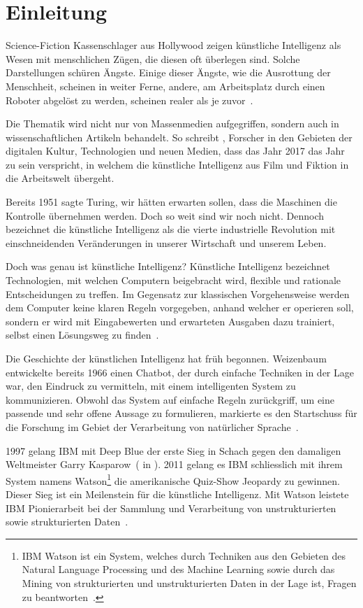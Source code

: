 \section{Einleitung}

Science-Fiction Kassenschlager aus Hollywood zeigen künstliche Intelligenz als Wesen mit menschlichen Zügen, die diesen oft überlegen sind. Solche Darstellungen schüren Ängste. Einige dieser Ängste, wie die Ausrottung der Menschheit, scheinen in weiter Ferne, andere, am Arbeitsplatz durch einen Roboter abgelöst zu werden, scheinen realer als je zuvor~\autocite{Lu2018}.

Die Thematik wird nicht nur von Massenmedien aufgegriffen, sondern auch in wissenschaftlichen Artikeln behandelt. So schreibt \textcite{Tredinnick2017}, Forscher in den Gebieten der digitalen Kultur, Technologien und neuen Medien, dass das Jahr 2017 das Jahr zu sein verspricht, in welchem die künstliche Intelligenz aus Film und Fiktion in die Arbeitswelt übergeht. 

Bereits 1951 sagte Turing, wir hätten erwarten sollen, dass die Maschinen die Kontrolle übernehmen werden. Doch so weit sind wir noch nicht. Dennoch bezeichnet \textcite{Tredinnick2017} die künstliche Intelligenz als die vierte industrielle Revolution mit einschneidenden Veränderungen in unserer Wirtschaft und unserem Leben.

Doch was genau ist künstliche Intelligenz? Künstliche Intelligenz bezeichnet Technologien, mit welchen Computern beigebracht wird, flexible und rationale Entscheidungen zu treffen. Im Gegensatz zur klassischen Vorgehensweise werden dem Computer keine klaren Regeln vorgegeben, anhand welcher er operieren soll, sondern er wird mit Eingabewerten und erwarteten Ausgaben dazu trainiert, selbst einen Lösungsweg zu finden~\autocite{Tredinnick2017}.

Die Geschichte der künstlichen Intelligenz hat früh begonnen. Weizenbaum entwickelte bereits 1966 einen Chatbot, der durch einfache Techniken in der Lage war, den Eindruck zu vermitteln, mit einem intelligenten System zu kommunizieren. Obwohl das System auf einfache Regeln zurückgriff, um eine passende und sehr offene Aussage zu formulieren, markierte es den Startschuss für die Forschung im Gebiet der Verarbeitung von natürlicher Sprache~\autocite{Tredinnick2017}. 

1997 gelang IBM mit Deep Blue der erste Sieg in Schach gegen den damaligen Weltmeister Garry Kasparow~(\cite{Campbell} in \cite{Tredinnick2017}). 2011 gelang es IBM schliesslich mit ihrem System namens Watson\footnote{IBM Watson ist ein System, welches durch Techniken aus den Gebieten des Natural Language Processing und des Machine Learning sowie durch das Mining von strukturierten und unstrukturierten Daten in der Lage ist, Fragen zu beantworten~\autocite{Tredinnick2017}.} die amerikanische Quiz-Show Jeopardy zu gewinnen. Dieser Sieg ist ein Meilenstein für die künstliche Intelligenz. Mit Watson leistete IBM Pionierarbeit bei der Sammlung und Verarbeitung von unstrukturierten sowie strukturierten Daten~\autocite{Tredinnick2017}.

